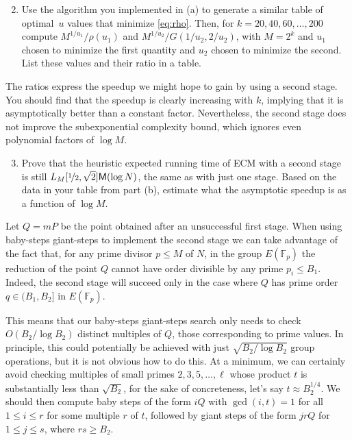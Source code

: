 \documentclass[11pt]{article}
\newcommand{\Fp}{\mathbb{F}_p}
\newcommand{\M}{\textsf{M}}
\theoremstyle{definition}
\begin{document}
\begin{enumerate}[{\bf (a)}]
\setcounter{enumi}{1}
\item Use the algorithm you implemented in (a) to generate a similar table of optimal~$u$ values that minimize \eqref{eq:rho}.
Then, for $k=20,40,60,\ldots,200$ compute $M^{1/u_1}/\rho(u_1)$ and $M^{1/u_2}/G(1/u_2,2/u_2)$, with $M=2^k$ and $u_1$ chosen to minimize the first quantity and $u_2$ chosen to minimize the second.  List these values and their ratio in a table.
\end{enumerate}

The ratios express the speedup we might hope to gain by using a second stage.
You should find that the speedup is clearly increasing with $k$, implying that it is asymptotically better than a constant factor.
Nevertheless, the second stage does not improve the subexponential complexity bound, which ignores even polynomial factors of $\log M$.

\begin{enumerate}[{\bf (a)}]
\setcounter{enumi}{2}
\item Prove that the heuristic expected running time of ECM with a second stage is still $L_M[\nicefrac{1}{2},\sqrt{2}]\M(\log N)$, the same as with just one stage.
Based on the data in your table from part (b), estimate what the asymptotic speedup is as a function of $\log M$.
\end{enumerate}

Let $Q=mP$ be the point obtained after an unsuccessful first stage.
When using baby-steps giant-steps to implement the second stage we can take advantage of the fact that, for any prime divisor $p\le M$ of $N$, in the group $E(\Fp)$ the reduction of the point $Q$ cannot have order divisible by any prime $p_i\le B_1$.  Indeed, the second stage will succeed only in the case where $Q$ has prime order $q\in(B_1,B_2]$ in $E(\Fp)$.

This means that our baby-steps giant-steps search only needs to check $O(B_2/\log B_2)$ distinct multiples of $Q$, those corresponding to prime values.
In principle, this could potentially be achieved with just $\sqrt{B_2/\log B_2}$ group operations, but it is not obvious how to do this.
At a minimum, we can certainly avoid checking multiples of small primes $2,3,5,\ldots,\ell$ whose product $t$ is substantially less than $\sqrt{B_2}$, for the sake of concreteness, let's say $t\approx B_2^{1/4}$.
We should then compute baby steps of the form $iQ$ with $\gcd(i,t)=1$ for all $1\le i\le r$ for some multiple $r$ of $t$, followed by giant steps of the form $jrQ$ for $1\le j\le s$, where $rs\ge B_2$.
\end{document}
